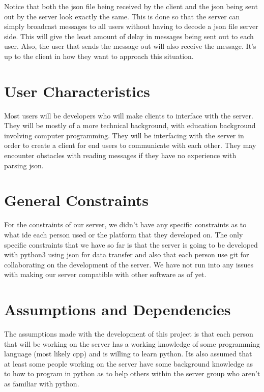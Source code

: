 Notice that both the \gls{json} file being received by the client and the \gls{json} being sent out by the server look exactly the same. This is done so that the server can simply broadcast messages to all users without having to decode a \gls{json} file server side. This will give the least amount of delay in messages being sent out to each user. Also, the user that sends the message out will also receive the message. It's up to the client in how they want to approach this situation.


\section{User Characteristics}\label{user-characteristics}
Most users will be developers who will make clients to interface with the server. They will be mostly of a more technical background, with education background involving computer programming. They will be interfacing with the server in order to create a client for end users to communicate with each other. They may encounter obstacles with reading messages if they have no experience with parsing \gls{json}.

\section{General Constraints}\label{general-constraints}
For the constraints of our server, we didn't have any specific constraints as to what \acrfull{ide} each person used or the platform that they developed on. The only specific constraints that we have so far is that the server is going to be developed with \gls{python}3 using \gls{json} for data transfer and also that each person use \gls{git} for collaborating on the development of the server. We have not run into any issues with making our server compatible with other software as of yet.

\section{Assumptions and
Dependencies}\label{assumptions-and-dependencies}
The assumptions made with the development of this project is that each person that will be working on the server has a working knowledge of some programming language (most likely \gls{cpp}) and is willing to learn python. Its also assumed that at least some people working on the server have some background knowledge as to how to program in python as to help others within the server group who aren't as familiar with \gls{python}.
